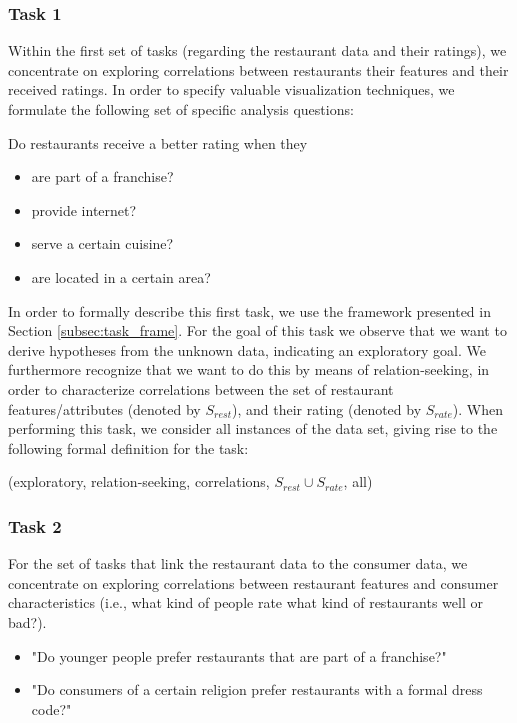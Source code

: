 \subsubsection{Task 1}\label{subsubsec:task1}
Within the first set of tasks (regarding the restaurant data and their ratings), we concentrate on exploring correlations between restaurants their features and their received ratings. In order to specify valuable visualization techniques, we formulate the following set of specific analysis questions:

Do restaurants receive a better rating when they
\begin{itemize}
\setlength{\itemsep}{0cm}%
\setlength{\parskip}{0cm}%
\item are part of a franchise?
\item provide internet?
\item serve a certain cuisine?
\item are located in a certain area?
\end{itemize}


In order to formally describe this first task, we use the framework presented in Section \ref{subsec:task_frame}. For the goal of this task we observe that we want to derive hypotheses from the unknown data, indicating an exploratory goal. We furthermore recognize that we want to do this by means of relation-seeking, in order to characterize correlations between the set of restaurant features/attributes (denoted by $S_{rest}$), and their rating (denoted by $S_{rate}$). When performing this task, we consider all instances of the data set, giving rise to the following formal definition for the task:

(exploratory, relation-seeking, correlations, $S_{rest} \cup S_{rate}$, all)

\subsubsection{Task 2}\label{subsubsec:task2}
For the set of tasks that link the restaurant data to the consumer data, we concentrate on exploring correlations between restaurant features and consumer characteristics (i.e., what kind of people rate what kind of restaurants well or bad?). 

\begin{itemize}
\setlength{\itemsep}{0cm}%
\setlength{\parskip}{0cm}%
\item "Do younger people prefer restaurants that are part of a franchise?"
\item "Do consumers of a certain religion prefer restaurants with a formal dress code?"
\end{itemize}

